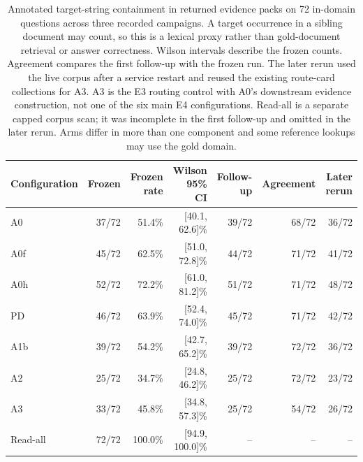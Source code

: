 \begin{table}[t]
\centering\small
\caption{Annotated target-string containment in returned evidence packs on 72
in-domain questions across three recorded campaigns. A target
occurrence in a sibling document may count, so this is a lexical proxy rather
than gold-document retrieval or answer correctness. Wilson intervals describe
the frozen counts. Agreement compares the first follow-up with the frozen
run. The later rerun used the live corpus after a service restart and
reused the existing route-card collections for A3. A3 is the E3 routing
control with A0's downstream evidence construction, not one of the six
main E4 configurations. Read-all is a separate capped corpus scan; it was
incomplete in the first follow-up and omitted in the later rerun. Arms
differ in more than one component and some reference lookups may use the gold
domain.}
\label{tab:s-arm-data}
\begin{tabular}{lrrrrrr}
\toprule
Configuration & Frozen & Frozen rate & Wilson 95\% CI & Follow-up & Agreement & Later rerun \\
\midrule
A0 & 37/72 & 51.4\% & [40.1, 62.6]\% & 39/72 & 68/72 & 36/72 \\
A0f & 45/72 & 62.5\% & [51.0, 72.8]\% & 44/72 & 71/72 & 41/72 \\
A0h & 52/72 & 72.2\% & [61.0, 81.2]\% & 51/72 & 71/72 & 48/72 \\
PD & 46/72 & 63.9\% & [52.4, 74.0]\% & 45/72 & 71/72 & 42/72 \\
A1b & 39/72 & 54.2\% & [42.7, 65.2]\% & 39/72 & 72/72 & 36/72 \\
A2 & 25/72 & 34.7\% & [24.8, 46.2]\% & 25/72 & 72/72 & 23/72 \\
A3 & 33/72 & 45.8\% & [34.8, 57.3]\% & 25/72 & 54/72 & 26/72 \\
Read-all & 72/72 & 100.0\% & [94.9, 100.0]\% & -- & -- & -- \\
\bottomrule
\end{tabular}
\end{table}
